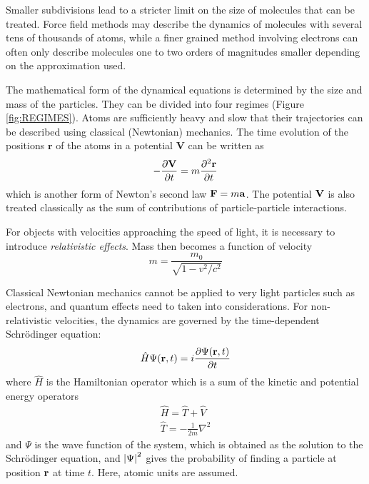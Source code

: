 Smaller subdivisions lead to a stricter limit on the size of molecules that can be treated. Force field methods may describe the dynamics of molecules with several tens of thousands of atoms, while a finer grained method involving electrons can often only describe molecules one to two orders of magnitudes smaller depending on the approximation used.

The mathematical form of the dynamical equations is determined by the size and mass of the particles. They can be divided into four regimes (Figure \ref{fig:REGIMES}). Atoms are sufficiently heavy and slow that their trajectories can be described using classical (Newtonian) mechanics. The time evolution of the positions $\mathbf{r}$ of the atoms in a potential $\mathbf{V}$ can be written as
\begin{equation}
-\frac{\partial \mathbf{V}}{\partial t} = m\frac{\partial^2 \mathbf{r}}{\partial t}
\end{equation} 
\noindent which is another form of Newton's second law $\mathbf{F} = m\mathbf{a}$. The potential $\mathbf{V}$ is also treated classically as the sum of contributions of particle-particle interactions.

For objects with velocities approaching the speed of light, it is necessary to introduce \emph{relativistic effects}. Mass then becomes a function of velocity
\begin{equation}
m = \frac{m_0}{\sqrt{1-v^2/c^2}}
\end{equation}

Classical Newtonian mechanics cannot be applied to very light particles such as electrons, and quantum effects need to taken into considerations. For non-relativistic velocities, the dynamics are governed by the time-dependent Schrödinger equation:
\begin{equation}
\hat{H} \Psi(\mathbf{r},t) = i \frac{\partial \Psi(\mathbf{r},t)}{\partial t}
\end{equation}
\noindent where $\hat{H}$ is the Hamiltonian operator which is a sum of the kinetic and potential energy operators
\begin{align}
\hat{H} = \hat{T} + \hat{V} \\
\hat{T} = -\frac{1}{2m} \nabla^2
\end{align}
\noindent and $\Psi$ is the wave function of the system, which is obtained as the solution to the Schrödinger equation, and $\abs{\Psi}^2$ gives the probability of finding a particle at position $\mathbf{r}$ at time $t$. Here, atomic units are assumed.

